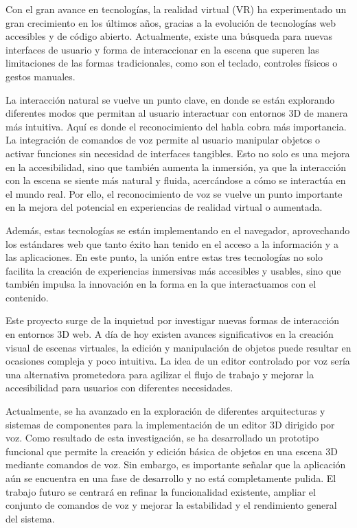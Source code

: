 \documentclass[a4paper, 12pt]{book}
\begin{document}
Con el gran avance en tecnologías, la realidad virtual (VR) ha experimentado un gran crecimiento en los últimos años, gracias a la evolución de tecnologías web accesibles y de código abierto. 
Actualmente, existe una búsqueda para nuevas interfaces de usuario y forma de interaccionar en la escena que superen las limitaciones de las formas tradicionales, como son el teclado, controles físicos o gestos manuales.

La interacción natural se vuelve un punto clave, en donde se están explorando diferentes modos que permitan al usuario interactuar con entornos 3D de manera más intuitiva.
Aquí es donde el reconocimiento del habla cobra más importancia. La integración de comandos de voz permite al usuario manipular objetos o activar funciones sin necesidad de interfaces tangibles.
Esto no solo es una mejora en la accesibilidad, sino que también aumenta la inmersión, ya que la interacción con la escena se siente más natural y fluida, acercándose a cómo se interactúa en el mundo real. 
Por ello, el reconocimiento de voz se vuelve un punto importante en la mejora del potencial en experiencias de realidad virtual o aumentada.

Además, estas tecnologías se están implementando en el navegador, aprovechando los estándares web que tanto éxito han tenido en el acceso a la información y a las aplicaciones.
En este punto, la unión entre estas tres tecnologías no solo facilita la creación de experiencias inmersivas más accesibles y usables, sino que también impulsa la innovación en la forma en la que interactuamos con el contenido.

Este proyecto surge de la inquietud por investigar nuevas formas de interacción en entornos 3D web. 
A día de hoy existen avances significativos en la creación visual de escenas virtuales, 
la edición y manipulación de objetos puede resultar en ocasiones compleja y poco intuitiva. 
La idea de un editor controlado por voz sería una alternativa prometedora para agilizar el flujo de trabajo y mejorar la accesibilidad para usuarios con diferentes necesidades.

Actualmente, se ha avanzado en la exploración de diferentes arquitecturas y sistemas de componentes para la implementación de un editor 3D dirigido por voz. Como resultado de esta investigación, se ha desarrollado un prototipo funcional que permite la creación y edición básica de objetos en una escena 3D mediante comandos de voz. 
Sin embargo, es importante señalar que la aplicación aún se encuentra en una fase de desarrollo y no está completamente pulida. El trabajo futuro se centrará en refinar la funcionalidad existente, ampliar el conjunto de comandos de voz y mejorar la estabilidad y el rendimiento general del sistema.
\end{document}

